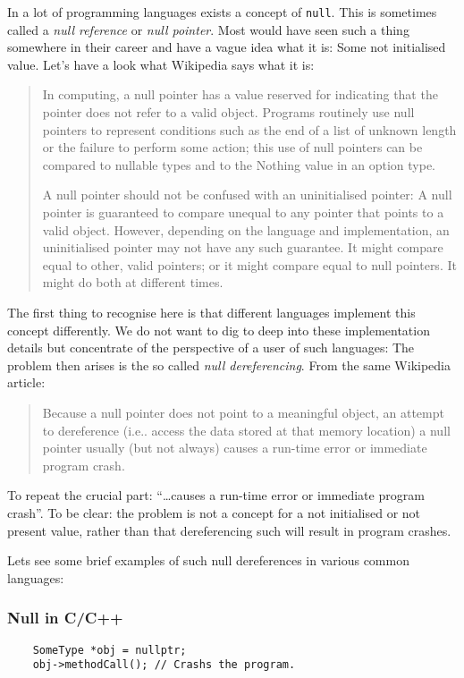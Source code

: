 \documentclass[a4paper,12pt]{report}
\begin{document}
In a lot of programming languages exists a concept of \verb|null|. This is sometimes called a \textit{null reference} or \textit{null pointer}. Most would have seen such a thing somewhere in their career and have a vague idea what it is: Some not initialised value. Let's have a look what Wikipedia\cite{null-wiki} says what it is:

\begin{quotation}
    In computing, a null pointer has a value reserved for indicating that the pointer does not refer to a valid object. Programs routinely use null pointers to represent conditions such as the end of a list of unknown length or the failure to perform some action; this use of null pointers can be compared to nullable types and to the Nothing value in an option type.

    A null pointer should not be confused with an uninitialised pointer: A null pointer is guaranteed to compare unequal to any pointer that points to a valid object. However, depending on the language and implementation, an uninitialised pointer may not have any such guarantee. It might compare equal to other, valid pointers; or it might compare equal to null pointers. It might do both at different times.
\end{quotation}

The first thing to recognise here is that different languages implement this concept differently. We do not want to dig to deep into these implementation details but concentrate of the perspective of a user of such languages: The problem then arises is the so called \textit{null dereferencing}. From the same Wikipedia\cite{null-wiki} article:

\begin{quotation}
    Because a null pointer does not point to a meaningful object, an attempt to dereference (i.e.. access the data stored at that memory location) a null pointer usually (but not always) causes a run-time error or immediate program crash.
\end{quotation}

To repeat the crucial part: ``\ldots causes a run-time error or immediate program crash''. To be clear: the problem is not a concept for a not initialised or not present value, rather than that dereferencing such will result in program crashes.

Lets see some brief examples of such null dereferences in various common languages:

\subsubsection{Null in C/C++}
\begin{verbatim}
    SomeType *obj = nullptr;
    obj->methodCall(); // Crashs the program.
\end{verbatim}
\end{document}
